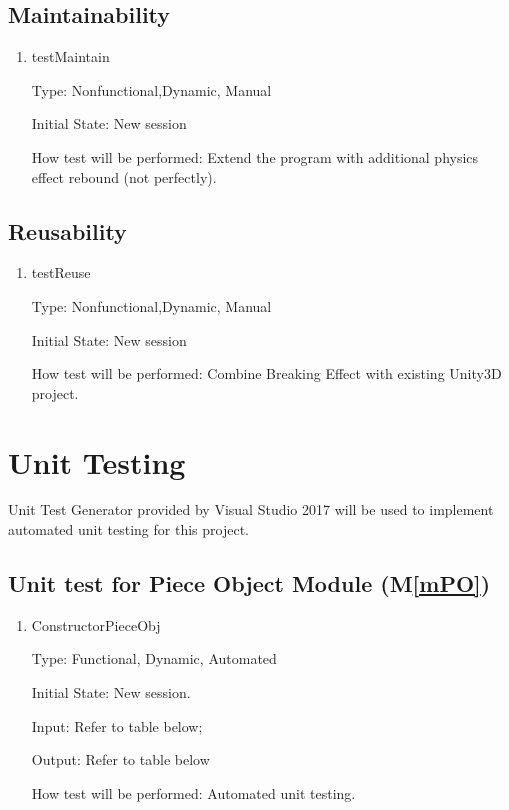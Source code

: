 \documentclass[12pt, titlepage]{article}
\newcommand{\mref}[1]{M\ref{#1}}
\begin{document}
\subsection{Maintainability}
	
	\begin{enumerate}
		
		\item{testMaintain}
		
		Type: Nonfunctional,Dynamic, Manual
		
		Initial State: New session
		
		How test will be performed: Extend the program with additional physics effect rebound (not perfectly).
		
	\end{enumerate}
	
\subsection{Reusability}
	
	\begin{enumerate}
		
		\item{testReuse}
		
		Type: Nonfunctional,Dynamic, Manual
		
		Initial State: New session
		
		How test will be performed: Combine Breaking Effect with existing Unity3D project.
		
	\end{enumerate}

\section{Unit Testing}
\label{Sec_UnitTest}
Unit Test Generator provided by Visual Studio 2017 will be used to implement automated unit testing for this project.

\subsection{Unit test for Piece Object Module (\mref{mPO})}
\label{Sec_UmPO}

\begin{enumerate}	
	\item{ConstructorPieceObj}
	
	Type: Functional, Dynamic, Automated
	
	Initial State: New session.
	
	Input: Refer to table below;
	
	Output: Refer to table below
	
	How test will be performed: Automated unit testing.
\end{enumerate}
\end{document}
